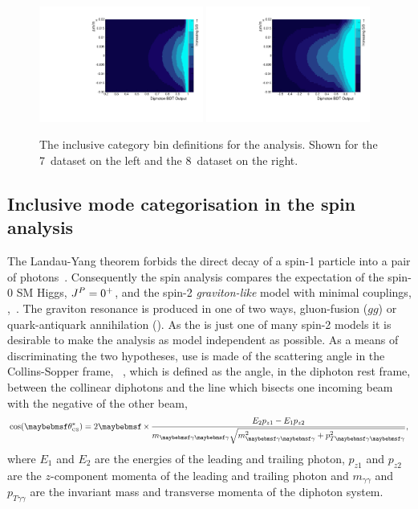\begin{figure}
  \includegraphics[width=0.48\textwidth]{selec_and_cats/plots/sideband_cats_7TeV_fix.pdf}
  \includegraphics[width=0.48\textwidth]{selec_and_cats/plots/sideband_cats_8TeV_fix.pdf}
  \caption[The inclusive category bin definitions for the \acs{SMVA} analysis]{The inclusive category bin definitions for the \SMVA analysis. Shown for the 7~\TeV dataset on the left and the 8~\TeV dataset on the right.}
  \label{fig:sideband_cats}
\end{figure}

\subsection{Inclusive mode categorisation in the spin analysis}
\label{sec:spin_cats}

The Landau-Yang theorem forbids the direct decay of a spin-1 particle into a pair of photons~\cite{Landau1948,Yang1950}. 
Consequently the spin analysis compares the expectation of the spin-0 SM Higgs, $J^{P}=0^{+}$, and the spin-2 \emph{graviton-like} 
model with minimal couplings, \twomp,~\cite{Gao2010}. The \twomp graviton resonance is produced in one of two ways, gluon-fusion ($gg$) 
or quark-antiquark annihilation (\qqbar). As the \twomp is just one of many spin-2 models it is desirable to make the analysis as model independent as possible. As a means of 
discriminating the two hypotheses, use is made of the scattering angle in the Collins-Sopper frame, \costhetastar ~\cite{CollinsSoper1977}, which is defined as the angle, in the diphoton rest frame, between the collinear diphotons 
and the line which bisects one incoming beam with the negative of the other beam, 
\begin{equation}
  \cos(\theta^{\ast}_{\mbox{\tiny{CS}}}) = 2\times\frac{E_{2}p_{z1}-E_{1}p_{z2}}{m_{\gamma\gamma}\sqrt{m^{2}_{\gamma\gamma}+p^{2}_{T\gamma\gamma}}},
  \label{eq:costheta}
\end{equation}
where $E_{1}$ and $E_{2}$ are the energies of the leading and trailing photon, $p_{z1}$ and $p_{z2}$ are the $z$-component momenta 
of the leading and trailing photon and $m_{\gamma\gamma}$ and $p_{T\gamma\gamma}$ are the invariant mass and transverse momenta of the diphoton system.

